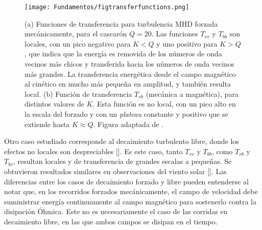 \begin{figure}[h!]
  \centering
  \texttt{[image: Fundamentos/figtransferfunctions.png]}
  \caption{(a) Funciones de transferencia para turbulencia MHD forzada
    mecánicamente, para el cascarón $Q = 20$. Las funciones $T_{vv}$ y
    $T_{bb}$ son locales, con un pico negativo para $K<Q$ y uno
    positivo para $K>Q$, que indica que la energía es removida de los
    números de onda vecinos más chicos y transferida hacia los números
    de onda vecinos más grandes. La transferencia energética desde el
    campo magnético al cinético en mucho más pequeña en amplitud, y
    también resulta local. (b) Función de transferencia $T_{vb}$
    (mecánica a magnética), para distintos valores de $K$. Esta
    función es no local, con un pico alto en la escala del forzado y
    con un \emph{plateau} constante y positivo que se extiende hasta
    $K\approx Q$. Figura adaptada de \cite{alexakis_imprint_2005}.}
  \label{fig:transferfunctions}
\end{figure}


Otro caso estudiado corresponde al decaimiento turbulento libre, donde
los efectos no locales son despreciables
[\cite{debliquy_energy_2005}]. Es este caso, tanto $T_{vv}$ y $T_{bb}$,
como $T_{vb}$ y $T_{bv}$, resultan locales y de transferencia de
grandes escalas a pequeñas. Se obtuvieron resultados similares en
observaciones del viento solar [\cite{bruno_solar_2005}]. Las
diferencias entre los casos de decaimiento forzado y libre pueden
entenderse al notar que, en los recorridos forzados mecánicamente, el
campo de velocidad debe suministrar energía continuamente al campo
magnético para sostenerlo contra la disipación Óhmica. Este no es
necesariamente el caso de las corridas en decaimiento libre, en las
que ambos campos se disipan en el tiempo.

